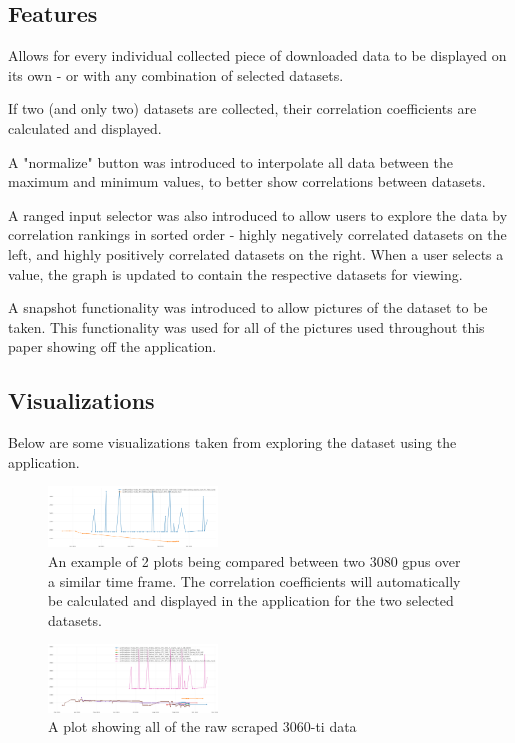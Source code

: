 \documentclass[twocolumn]{article}
\begin{document}
\subsection{Features}
Allows for every individual collected piece of downloaded data to be displayed on its own - or with any combination of selected datasets. 

If two (and only two) datasets are collected, their correlation coefficients are calculated and displayed. 

A "normalize" button was introduced to interpolate all data between the maximum and minimum values, to better show correlations between datasets.

A ranged input selector was also introduced to allow users to explore the data by correlation rankings in sorted order - highly negatively correlated datasets on the left, and highly positively correlated datasets on the right. When a user selects a value, the graph is updated to contain the respective datasets for viewing.

A snapshot functionality was introduced to allow pictures of the dataset to be taken. This functionality was used for all of the pictures used throughout this paper showing off the application.
\subsection{Visualizations}
Below are some visualizations taken from exploring the dataset using the application. 


\begin{figure}[h]
\centering
\includegraphics[width=0.4\textwidth]{3080-two-plot-example} 
\caption{An example of 2 plots being compared between two 3080 gpus over a similar time frame. The correlation coefficients will automatically be calculated and displayed in the application for the two selected datasets.}
\label{fig:plotExample}
\end{figure}

\begin{figure}[h]
\centering
\includegraphics[width=0.4\textwidth]{3060-ti} 
\caption{A plot showing all of the raw scraped 3060-ti data}
\label{fig:3060_ti}
\end{figure}
\end{document}
